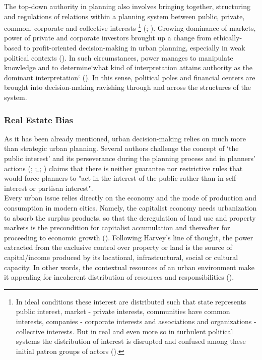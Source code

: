 \documentclass[11pt]{report}
\begin{document}
The top-down authority in planning also involves bringing together, structuring and regulations of relations within a planning system between public, private, common, corporate and collective interests
\footnote{In ideal conditions these interest are distributed such that state represents public interest, market - private interests, communities have common interests, companies - corporate interests and associations and organizations - collective interests.
But in real and even more so in turbulent political systems the distribution of interest is disrupted and confused among these initial patron groups of actors (\href{Vujosevic}{\citealt{Vujosevic_Regionalizam_2015}}).}
(\href{Maksic}{\citealt{Maksic_european_2012}}; \href{Vujosevic}{\citealt{Vujosevic_Regionalizam_2015}}).
Growing dominance of markets, power of private and corporate investors brought up a change from ethically-based to profit-oriented decision-making in urban planning, especially in weak political contexts (\href{Lazarevic}{\cite{Lazarevic_Rational_2009}}).
In such circumstances, power manages to manipulate knowledge and to determine`what kind of interpretation attains authority as the dominant interpretation` (\href{Getimis}{\citealt{Getimis 2012}}).
In this sense, political poles and financial centers are brought into decision-making ravishing through and across the structures of the system.

\subsubsection{Real Estate Bias}

As it has been already mentioned, urban decision-making relies on much more than strategic urban planning.
Several authors challenge the concept of ‘the public interest’ and its perseverance during the planning process and in planners' actions
(\href{Alexander}{\citealt{alexander_XXX_2002}};
\href{Campbell}{{\citealt{campbel_XXX_2012}};
\href{Moroni}{\citealt{moroni_XXXX_2004}}};
\href{Sager}{\citealt{Sager_logic_2006}})
\href{Sager}{\cite{sager_logic_2006}} claims that there is neither guarantee nor restrictive rules that would force planners to "act in the interest of the public rather than in self-interest or partisan interest".
\\

Every urban issue relies directly on the economy  and  the  mode  of  production  and  consumption  in  modern  cities.  Namely,  the  capitalist  economy  needs urbanization to absorb the surplus products, so that the deregulation of land use and property markets is the precondition for capitalist accumulation and thereafter for proceeding to economic growth (\href{Harvey}{\citealt{Harvey_rebel_2012}}).
Following Harvey’s line of thought, the power  extracted  from  the  exclusive  control  over  property  or  land  is  the  source  of  capital/income  produced  by  its  locational, infrastructural, social or cultural capacity.
In other words, the contextual resources of an urban environment make it appealing for incoherent distribution of resources and responsibilities (\href{Bolay}{\citealt{Bolay_urban_2005}}).
\\
\end{document}
